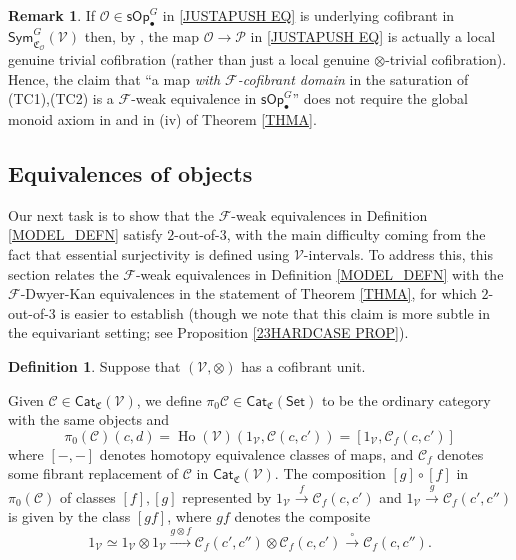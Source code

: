 \documentclass[a4paper,10pt
,draft
]{article}%
\numberwithin{equation}{section}
\numberwithin{figure}{section}
\theoremstyle{definition} %
\newtheorem{definition}[equation]{Definition}%
\newtheorem{remark}[equation]{Remark}%
\newcommand{\Cat}{\mathsf{Cat}}
\DeclareMathOperator{\Ho}{Ho}
\newcommand{\F}{\ensuremath{\mathcal F}}
\newcommand{\V}{\ensuremath{\mathcal V}}
\renewcommand{\O}{\ensuremath{\mathcal O}}
\renewcommand{\P}{\ensuremath{\mathcal P}}
\newcommand{\1}{\ensuremath{\mathbbm 1}}%
\begin{document}
\begin{remark}\label{JCELLSM REM}
	If $\O \in \mathsf{sOp}^G_{\bullet}$
	in \eqref{JUSTAPUSH EQ}
	is underlying cofibrant in $\mathsf{Sym}^G_{\mathfrak{C}_{\O}}(\V)$
	then, by \cite[Rem. \ref{OC-THMISM REM}]{BP_FCOP},
	the map $\O \to \P$ in \eqref{JUSTAPUSH EQ}
	is actually a local genuine trivial cofibration 
	(rather than just a local genuine $\otimes$-trivial cofibration).
	Hence, the claim that 
	``a map \emph{with $\F$-cofibrant domain} in the saturation
	of (TC1),(TC2) is a $\F$-weak equivalence in
	$\mathsf{sOp}^G_{\bullet}$'' 
	does not require the global monoid axiom
	in \cite[Def. \ref{OC-GLOBMONAX_DEF}]{BP_FCOP}
	and in (iv) of Theorem \ref{THMA}.
\end{remark}







\subsection{Equivalences of objects}\label{EQUIVOBJ_SEC}


Our next task is to show that the
$\F$-weak equivalences
in Definition \ref{MODEL_DEFN}
satisfy $2$-out-of-$3$,
with the main difficulty coming 
from the fact that essential surjectivity is 
defined using $\V$-intervals.
%
To address this, this section relates the $\F$-weak equivalences
in Definition \ref{MODEL_DEFN} with the $\F$-Dwyer-Kan equivalences
in the statement of Theorem \ref{THMA},
for which $2$-out-of-$3$ is easier to establish
(though we note that this claim is more subtle in 
the equivariant setting;
see Proposition \ref{23HARDCASE PROP}).



\begin{definition}\label{HTPY_DEFN}
	Suppose that $(\V,\otimes)$ has a cofibrant unit.

	Given $\mathcal C \in \Cat_{\mathfrak{C}}(\V)$,
	we define $\pi_0 \mathcal C \in \Cat_{\mathfrak{C}}(\mathsf{Set})$ 
	to be the ordinary category with the same objects and
\[
	\pi_0(\mathcal{C})(c,d)=
	\Ho(\V)(1_\V, \mathcal C(c,c'))=
	[1_\V, \mathcal{C}_f(c,c')]
\]
where $[-,-]$ denotes homotopy equivalence classes of maps,
and $\mathcal{C}_f$ denotes some fibrant replacement of
$\mathcal C$ in $\Cat_{\mathfrak{C}}(\V)$.
The composition $[g]\circ [f]$
in $\pi_0(\mathcal{C})$
of classes $[f],[g]$
represented by
$1_{\mathcal{V}} \xrightarrow{f} \mathcal{C}_f({c,c'})$
and 
$1_{\mathcal{V}} \xrightarrow{g} \mathcal{C}_f({c',c''})$
is given by the class $[gf]$, where $gf$ denotes the composite
\begin{equation}\label{COMPI0 EQ}
1_{\mathcal{V}} \simeq
1_{\mathcal{V}} \otimes 1_{\mathcal{V}} \xrightarrow{g \otimes f}
\mathcal{C}_f({c',c''}) \otimes  \mathcal{C}_f({c,c'}) \xrightarrow{\circ}
\mathcal{C}_f({c,c''}).
\end{equation}
\end{definition}
\end{document}
